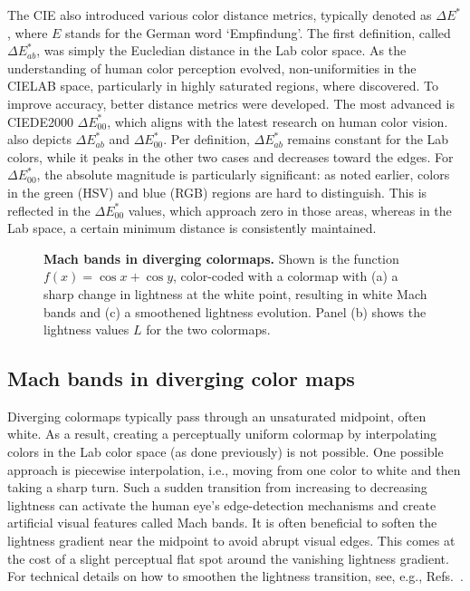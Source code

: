 The CIE also introduced various color distance metrics, typically denoted as $\Delta E^*$, where $E$ stands for the German word `Empfindung'. The first definition, called $\Delta E^*_{ab}$, was simply the Eucledian distance in the Lab color space. As the understanding of human color perception evolved, non-uniformities in the CIELAB space, particularly in highly saturated regions, where discovered. To improve accuracy, better distance metrics were developed. The most advanced is CIEDE2000 $\Delta E^*_{00}$, which aligns with the latest research on human color vision. 
 also depicts $\Delta E^*_{ab}$ and $\Delta E^*_{00}$. 
Per definition, $\Delta E^*_{ab}$ remains constant for the Lab colors, while it peaks in the other two cases and decreases toward the edges. For $\Delta E^*_{00}$, the absolute magnitude is particularly significant: as noted earlier, colors in the green (HSV) and blue (RGB) regions are hard to distinguish. This is reflected in the $\Delta E^*_{00}$ values, which approach zero in those areas, whereas in the Lab space, a certain minimum distance is consistently maintained.



\begin{figure}
	\centering
	
	\caption{\textbf{Mach bands in diverging colormaps.} Shown is the function $f(x) = \cos x + \cos y$, color-coded with a colormap with (a) a sharp change in lightness at the white point, resulting in white Mach bands and (c) a smoothened lightness evolution. Panel (b) shows the lightness values $L$ for the two colormaps.}
	\label{fig:machbands}
\end{figure}

\subsection{Mach bands in diverging color maps}

Diverging colormaps typically pass through an unsaturated midpoint, often white. As a result, creating a perceptually uniform colormap by interpolating colors in the Lab color space (as done previously) is not possible. One possible approach is piecewise interpolation, i.e., moving from one color to white and then taking a sharp turn.  Such a sudden transition from increasing to decreasing lightness can activate the human eye's edge-detection mechanisms and create artificial visual features called Mach bands. It is often beneficial to soften the lightness gradient near the midpoint to avoid abrupt visual edges. This comes at the cost of a slight perceptual flat spot around the vanishing lightness gradient. For technical details on how to smoothen the lightness transition, see, e.g., Refs.~\cite{moreland2009,kovesi2015}.

